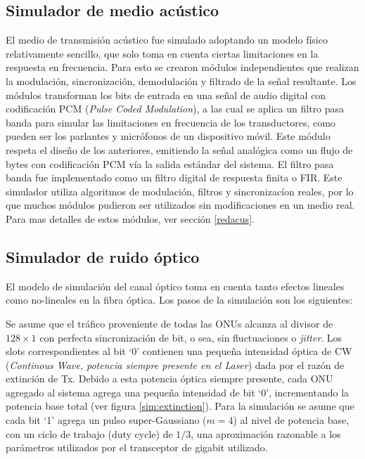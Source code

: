\subsection{Simulador de medio acústico}

El medio de transmisión acústico fue simulado adoptando un modelo físico relativamente sencillo, que solo toma en cuenta ciertas limitaciones en la respuesta en frecuencia. Para esto se crearon módulos independientes que realizan la modulación, sincronización, demodulación y filtrado de la señal resultante.
Los módulos transforman los bits de entrada en una señal de audio digital con codificación PCM (\textit{Pulse Coded Modulation}), a las cual se aplica un filtro pasa banda para simular las limitaciones en frecuencia de los transductores, como pueden ser los parlantes y micrófonos de un dispositivo móvil. Este módulo respeta el diseño de los anteriores, emitiendo la señal analógica como un flujo de bytes con codificación PCM vía la salida estándar del sistema. El filtro pasa banda fue implementado como un filtro digital de respuesta finita o FIR.
Este simulador utiliza algoritmos de modulación, filtros y sincronizacíon reales, por lo que muchos módulos pudieron ser utilizados sin modificaciones en un medio real. Para mas detalles de estos módulos, ver sección \ref{redacus}.

\subsection{Simulador de ruido óptico}

El modelo de simulación del canal óptico toma en cuenta tanto efectos lineales como no-lineales en la fibra óptica. Los pasos de la simulación son los siguientes:

Se asume que el tráfico proveniente de todas las ONUs alcanza al divisor de $128\times1$ con perfecta sincronización de bit, o sea, sin fluctuaciones o \textit{jitter}.
Los slots correspondientes al bit `0' contienen una pequeña intensidad óptica de CW (\textit{Continous Wave, potencia siempre presente en el Laser}) dada por el razón de extinción de Tx.
Debido a esta potencia óptica siempre presente, cada ONU agregado al sistema agrega una pequeña intensidad de bit `0', incrementando la potencia base total (ver figura \ref{sim:extinction}).
Para la simulación se asume que cada bit `1' agrega un pulso super-Gaussiano ($m=4$) al nivel de potencia base, con un ciclo de trabajo (duty cycle) de $1/3$, una aproximación razonable a los parámetros utilizados por el transceptor de gigabit utilizado.

